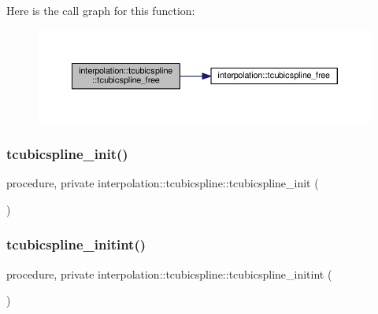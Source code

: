 Here is the call graph for this function\+:
\nopagebreak
\begin{figure}[H]
\begin{center}
\leavevmode
\includegraphics[width=350pt]{structinterpolation_1_1tcubicspline_ab4de3dd4dec20d9bd54e7668989fe15e_cgraph}
\end{center}
\end{figure}
\mbox{\label{structinterpolation_1_1tcubicspline_a192c42fc0b10bd2aac67816e8304cf6f}} 
\subsubsection{\texorpdfstring{tcubicspline\+\_\+init()}{tcubicspline\_init()}}
{\footnotesize\ttfamily procedure, private interpolation\+::tcubicspline\+::tcubicspline\+\_\+init (\begin{DoxyParamCaption}{ }\end{DoxyParamCaption})\hspace{0.3cm}{\ttfamily [private]}}

\mbox{\label{structinterpolation_1_1tcubicspline_a199574faf60d20d8a50703dcf1719093}} 
\subsubsection{\texorpdfstring{tcubicspline\+\_\+initint()}{tcubicspline\_initint()}}
{\footnotesize\ttfamily procedure, private interpolation\+::tcubicspline\+::tcubicspline\+\_\+initint (\begin{DoxyParamCaption}{ }\end{DoxyParamCaption})\hspace{0.3cm}{\ttfamily [private]}}



